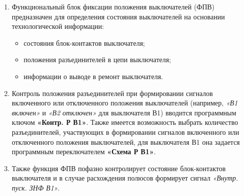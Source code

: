 
\color{black}

\begin{enumerate}[label=\arabic{section}.\arabic{subsection}.\arabic{enumi}, labelsep=4pt, leftmargin=0pt, itemindent=57pt, itemsep=0pt, parsep=5pt] %

\item
Функциональный блок фиксации положения выключателей (ФПВ) предназначен для определения 
состояния выключателей на основании технологической информации:

\begin{itemize}
    \item состояния блок-контактов выключателя;
    \item положения разъединителей в цепи выключателя;
    \item информации о выводе в ремонт выключателя.
\end{itemize}

\item
Контроль положения разъединителей при формировании сигналов включенного или отключенного 
положения выключателей (например, \textit{«В1 включен»} и \textit{«В2 отключен»} для выключателя В1) вводится 
программным ключом \textbf{«Контр. Р В1»}. Также имеется возможность выбрать количество разъединителей, 
участвующих в формировании сигналов включенного или отключенного положения выключателей, для 
выключателя В1 она задается программным переключателем \textbf{«Схема Р В1»}.

\item
Также функция ФПВ пофазно контролирует состояние блок-контактов выключателя и в случае 
расхождения полюсов формирует сигнал \textit{«Внутр. пуск. ЗНФ В1»}.

\end{enumerate}